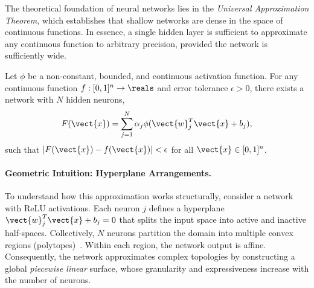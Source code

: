 The theoretical foundation of neural networks lies in the \emph{Universal Approximation Theorem}, which establishes that shallow networks are dense in the space of continuous functions. In essence, a single hidden layer is sufficient to approximate any continuous function to arbitrary precision, provided the network is sufficiently wide.

\begin{theorem}
    Let $\phi$ be a non-constant, bounded, and continuous activation function. For any continuous function $f: [0,1]^n \to \reals$ and error tolerance $\epsilon > 0$, there exists a network with $N$ hidden neurons,
    \begin{equation}
        F(\vect{x}) = \sum_{j=1}^{N} \alpha_j \phi(\vect{w}_j^T \vect{x} + b_j),
    \end{equation}
    such that $|F(\vect{x}) - f(\vect{x})| < \epsilon$ for all $\vect{x} \in [0,1]^n$.
\end{theorem}

\paragraph{Geometric Intuition: Hyperplane Arrangements.}
To understand how this approximation works structurally, consider a network with ReLU activations. Each neuron $j$ defines a hyperplane $\vect{w}_j^T\vect{x} + b_j = 0$ that splits the input space into active and inactive half-spaces. Collectively, $N$ neurons partition the domain into multiple convex regions (polytopes)~\cite{Zaslavsky1975}. Within each region, the network output is affine. Consequently, the network approximates complex topologies by constructing a global \emph{piecewise linear} surface, whose granularity and expressiveness increase with the number of neurons.


